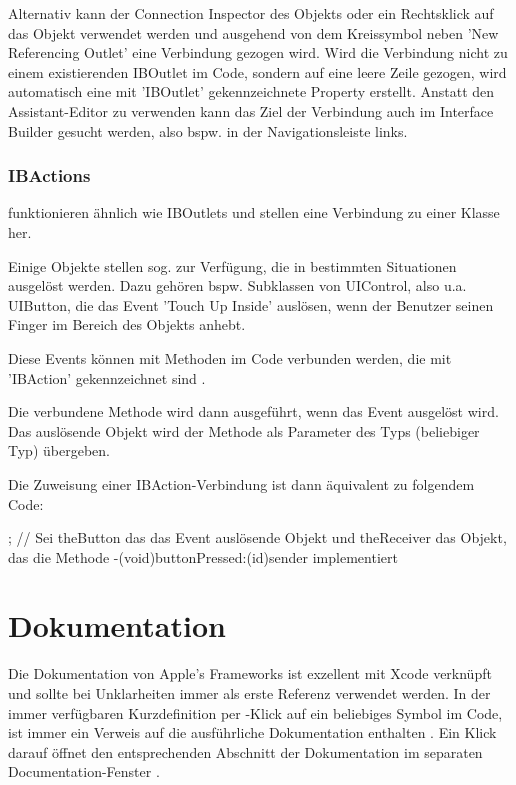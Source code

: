 \documentclass[parskip=half, final]{scrreprt}
\begin{document}
Alternativ kann der Connection Inspector des Objekts  oder ein Rechtsklick auf das Objekt verwendet werden und ausgehend von dem Kreissymbol neben 'New Referencing Outlet' eine Verbindung gezogen wird. Wird die Verbindung nicht zu einem existierenden IBOutlet im Code, sondern auf eine leere Zeile gezogen, wird automatisch eine mit 'IBOutlet' gekennzeichnete Property erstellt. Anstatt den Assistant-Editor zu verwenden kann das Ziel der Verbindung auch im Interface Builder gesucht werden, also bspw. in der Navigationsleiste links.

\subsubsection{IBActions}

 funktionieren ähnlich wie IBOutlets und stellen eine Verbindung zu  einer Klasse her.

Einige Objekte stellen sog.  zur Verfügung, die in bestimmten Situationen ausgelöst werden. Dazu gehören bspw. Subklassen von UIControl, also u.a. UIButton, die das Event 'Touch Up Inside' auslösen, wenn der Benutzer seinen Finger im Bereich des Objekts anhebt.

Diese Events können mit Methoden im Code verbunden werden, die mit 'IBAction' gekennzeichnet sind .


Die verbundene Methode wird dann ausgeführt, wenn das Event ausgelöst wird. Das auslösende Objekt wird der Methode als Parameter  des Typs  (beliebiger Typ) übergeben.

Die Zuweisung einer IBAction-Verbindung ist dann äquivalent zu folgendem Code:
\begin{objclst}
; // Sei theButton das das Event auslösende Objekt und theReceiver das Objekt, das die Methode -(void)buttonPressed:(id)sender implementiert
\end{objclst}

\section{Dokumentation}\label{sec:xcode_documentation}

Die Dokumentation von Apple's Frameworks ist exzellent mit Xcode verknüpft und sollte bei Unklarheiten immer als erste Referenz verwendet werden. In der immer verfügbaren Kurzdefinition per \keysc{\altkey}-Klick auf ein beliebiges Symbol im Code, ist immer ein Verweis auf die ausführliche Dokumentation enthalten . Ein Klick darauf öffnet den entsprechenden Abschnitt der Dokumentation im separaten Documentation-Fenster .
\end{document}
